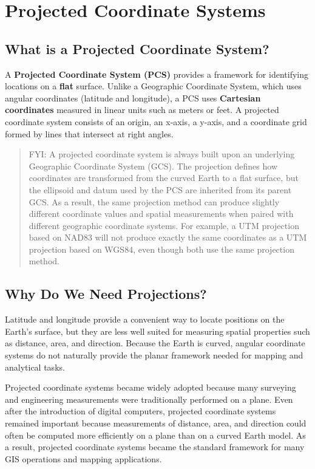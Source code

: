 \documentclass[
  letterpaper,
]{book}
\begin{document}
\section{Projected Coordinate
Systems}\label{projected-coordinate-systems}

\subsection{What is a Projected Coordinate
System?}\label{what-is-a-projected-coordinate-system}

A \textbf{Projected Coordinate System (PCS)} provides a framework for
identifying locations on a \textbf{flat} surface. Unlike a Geographic
Coordinate System, which uses angular coordinates (latitude and
longitude), a PCS uses \textbf{Cartesian coordinates} measured in linear
units such as meters or feet. A projected coordinate system consists of
an origin, an x-axis, a y-axis, and a coordinate grid formed by lines
that intersect at right angles.

\begin{quote}
FYI: A projected coordinate system is always built upon an underlying
Geographic Coordinate System (GCS). The projection defines how
coordinates are transformed from the curved Earth to a flat surface, but
the ellipsoid and datum used by the PCS are inherited from its parent
GCS. As a result, the same projection method can produce slightly
different coordinate values and spatial measurements when paired with
different geographic coordinate systems. For example, a UTM projection
based on NAD83 will not produce exactly the same coordinates as a UTM
projection based on WGS84, even though both use the same projection
method.
\end{quote}

\subsection{Why Do We Need
Projections?}\label{why-do-we-need-projections}

Latitude and longitude provide a convenient way to locate positions on
the Earth's surface, but they are less well suited for measuring spatial
properties such as distance, area, and direction. Because the Earth is
curved, angular coordinate systems do not naturally provide the planar
framework needed for mapping and analytical tasks.

Projected coordinate systems became widely adopted because many
surveying and engineering measurements were traditionally performed on a
plane. Even after the introduction of digital computers, projected
coordinate systems remained important because measurements of distance,
area, and direction could often be computed more efficiently on a plane
than on a curved Earth model. As a result, projected coordinate systems
became the standard framework for many GIS operations and mapping
applications.
\end{document}

